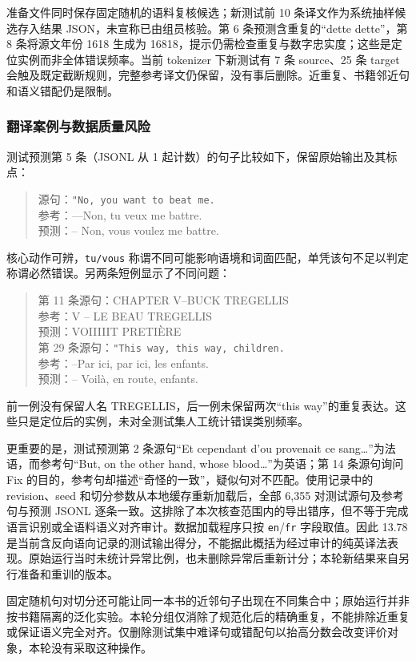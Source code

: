 \documentclass[UTF8,a4paper,12pt,fontset=none]{ctexart}
\begin{document}
准备文件同时保存固定随机的语料复核候选；新测试前 10 条译文作为系统抽样候选存入结果 JSON，未宣称已由组员核验。第 6 条预测含重复的“dette dette”，第 8 条将源文年份 1618 生成为 16818，提示仍需检查重复与数字忠实度；这些是定位实例而非全体错误频率。当前 tokenizer 下新测试有 7 条 source、25 条 target 会触及既定截断规则，完整参考译文仍保留，没有事后删除。近重复、书籍邻近句和语义错配仍是限制。

\subsubsection{翻译案例与数据质量风险}
测试预测第 5 条（JSONL 从 1 起计数）的句子比较如下，保留原始输出及其标点：
\begin{quote}\small
源句：\texttt{"No, you want to beat me.}\\
参考：—Non, tu veux me battre.\\
预测：-- Non, vous voulez me battre.
\end{quote}
核心动作可辨，\texttt{tu/vous} 称谓不同可能影响语境和词面匹配，单凭该句不足以判定称谓必然错误。另两条短例显示了不同问题：
\begin{quote}\small
第 11 条源句：CHAPTER V--BUCK TREGELLIS\\
参考：V -- LE BEAU TREGELLIS\\
预测：VOIIIIIT PRETIÈRE\\[0.4em]
第 29 条源句：\texttt{"This way, this way, children.}\\
参考：--Par ici, par ici, les enfants.\\
预测：-- Voilà, en route, enfants.
\end{quote}
前一例没有保留人名 TREGELLIS，后一例未保留两次“this way”的重复表达。这些只是定位后的实例，未对全测试集人工统计错误类别频率。

更重要的是，测试预测第 2 条源句“Et cependant d’ou provenait ce sang…”为法语，而参考句“But, on the other hand, whose blood…”为英语；第 14 条源句询问 Fix 的目的，参考句却描述“奇怪的一致”，疑似句对不匹配。使用记录中的 revision、seed 和切分参数从本地缓存重新加载后，全部 6,355 对测试源句及参考句与预测 JSONL 逐条一致。这排除了本次核查范围内的导出错序，但不等于完成语言识别或全语料语义对齐审计。数据加载程序只按 \texttt{en}/\texttt{fr} 字段取值。因此 13.78 是当前含反向语向记录的测试输出得分，不能据此概括为经过审计的纯英译法表现。原始运行当时未统计异常比例，也未删除异常后重新计分；本轮新结果来自另行准备和重训的版本。

固定随机句对切分还可能让同一本书的近邻句子出现在不同集合中；原始运行并非按书籍隔离的泛化实验。本轮分组仅消除了规范化后的精确重复，不能排除近重复或保证语义完全对齐。仅删除测试集中难译句或错配句以抬高分数会改变评价对象，本轮没有采取这种操作。
\end{document}
